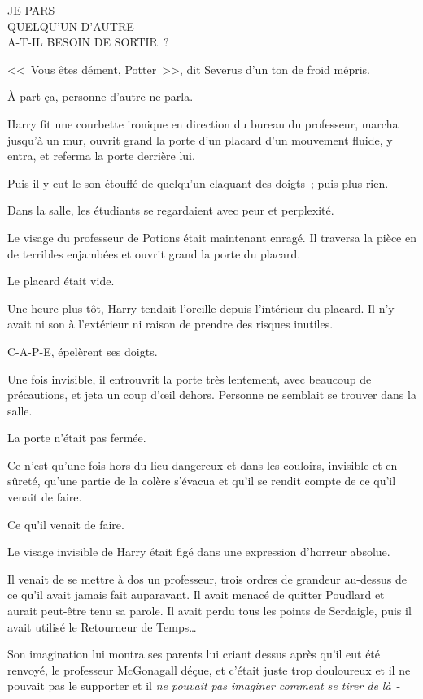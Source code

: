 \begin{writtenNote}
JE PARS\\
QUELQU'UN D'AUTRE\\
A-T-IL BESOIN DE SORTIR~?
\end{writtenNote}

<<~Vous êtes dément, Potter~>>, dit Severus d'un ton de froid mépris.

À part ça, personne d'autre ne parla.

Harry fit une courbette ironique en direction du bureau du professeur, marcha jusqu'à un mur, ouvrit grand la porte d'un placard d'un mouvement fluide, y entra, et referma la porte derrière lui.

Puis il y eut le son étouffé de quelqu'un claquant des doigts~; puis plus rien.

Dans la salle, les étudiants se regardaient avec peur et perplexité.

Le visage du professeur de Potions était maintenant enragé. Il traversa la pièce en de terribles enjambées et ouvrit grand la porte du placard.

Le placard était vide.

\later

Une heure plus tôt, Harry tendait l'oreille depuis l'intérieur du placard. Il n'y avait ni son à l'extérieur ni raison de prendre des risques inutiles.

C-A-P-E, épelèrent ses doigts.

Une fois invisible, il entrouvrit la porte très lentement, avec beaucoup de précautions, et jeta un coup d'œil dehors. Personne ne semblait se trouver dans la salle.

La porte n'était pas fermée.

Ce n'est qu'une fois hors du lieu dangereux et dans les couloirs, invisible et en sûreté, qu'une partie de la colère s'évacua et qu'il se rendit compte de ce qu'il venait de faire.

Ce qu'il venait de faire.

Le visage invisible de Harry était figé dans une expression d'horreur absolue.

Il venait de se mettre à dos un professeur, trois ordres de grandeur au-dessus de ce qu'il avait jamais fait auparavant. Il avait menacé de quitter Poudlard et aurait peut-être tenu sa parole. Il avait perdu tous les points de Serdaigle, puis il avait utilisé le Retourneur de Temps…

Son imagination lui montra ses parents lui criant dessus après qu'il eut été renvoyé, le professeur McGonagall déçue, et c'était juste trop douloureux et il ne pouvait pas le supporter et il \emph{ne pouvait pas imaginer comment se tirer de là}~-

